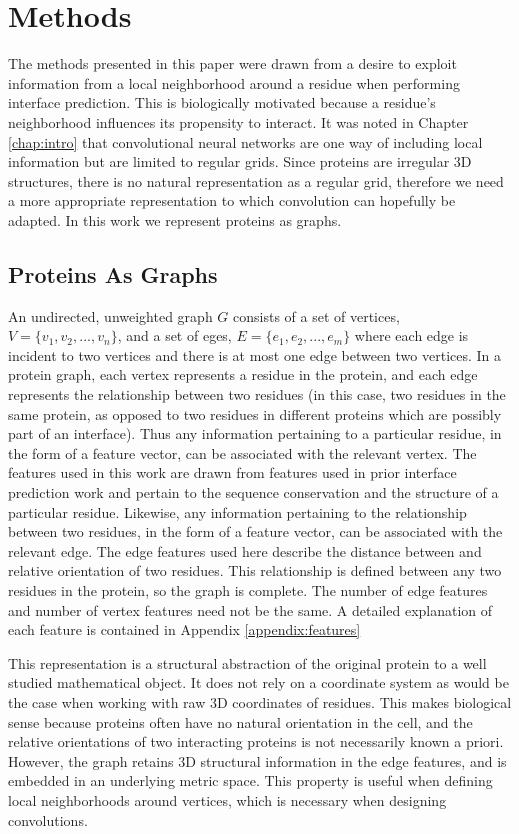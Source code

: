 \chapter{Methods}
\label{chap:methods}

The methods presented in this paper were drawn from a desire to exploit information from a local neighborhood around a residue when performing interface prediction.
This is biologically motivated because a residue's neighborhood influences its propensity to interact.
It was noted in Chapter \ref{chap:intro} that convolutional neural networks are one way of including local information but are limited to regular grids. 
Since proteins are irregular 3D structures, there is no natural representation as a regular grid, therefore we need a more appropriate representation to which convolution can hopefully be adapted.
In this work we represent proteins as graphs.


\section{Proteins As Graphs}

An undirected, unweighted graph $G$ consists of a set of vertices, $V=\{v_1, v_2, ..., v_n\}$, and a set of eges, $E=\{e_1, e_2, ..., e_m\}$ where each edge is incident to two vertices and there is at most one edge between two vertices.
In a protein graph, each vertex represents a residue in the protein, and each edge represents the relationship between two residues (in this case, two residues in the same protein, as opposed to two residues in different proteins which are possibly part of an interface).
Thus any information pertaining to a particular residue, in the form of a feature vector, can be associated with the relevant vertex.
The features used in this work are drawn from features used in prior interface prediction work \cite{minhas2014} and pertain to the sequence conservation and the structure of a particular residue. 
Likewise, any information pertaining to the relationship between two residues, in the form of a feature vector, can be associated with the relevant edge.
The edge features used here describe the distance between and relative orientation of two residues.
This relationship is defined between any two residues in the protein, so the graph is complete. 
The number of edge features and number of vertex features need not be the same.
A detailed explanation of each feature is contained in Appendix \ref{appendix:features}

This representation is a structural abstraction of the original protein to a well studied mathematical object.
It does not rely on a coordinate system as would be the case when working with raw 3D coordinates of residues.
This makes biological sense because proteins often have no natural orientation in the cell, and the relative orientations of two interacting proteins is not necessarily known a priori.
However, the graph retains 3D structural information in the edge features, and is embedded in an underlying metric space. 
This property is useful when defining local neighborhoods around vertices, which is necessary when designing convolutions.

